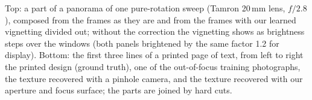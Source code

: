 Top: a part of a panorama of one pure-rotation sweep (Tamron 20\,mm lens, $f/2.8$), composed from the frames as they are and from the frames with our learned vignetting divided out; without the correction the vignetting shows as brightness steps over the windows (both panels brightened by the same factor 1.2 for display). Bottom: the first three lines of a printed page of text, from left to right the printed design (ground truth), one of the out-of-focus training photographs, the texture recovered with a pinhole camera, and the texture recovered with our aperture and focus surface; the parts are joined by hard cuts.
